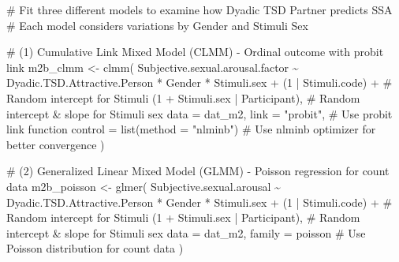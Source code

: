 \documentclass[
  bookmarksnumbered]{article}
\newenvironment{Shaded}{\begin{snugshade}}{\end{snugshade}}
\newcommand{\AttributeTok}[1]{\textcolor[rgb]{0.80,0.80,0.80}{#1}}
\newcommand{\CommentTok}[1]{\textcolor[rgb]{0.50,0.62,0.50}{#1}}
\newcommand{\DecValTok}[1]{\textcolor[rgb]{0.86,0.86,0.80}{#1}}
\newcommand{\FunctionTok}[1]{\textcolor[rgb]{0.94,0.94,0.56}{#1}}
\newcommand{\NormalTok}[1]{\textcolor[rgb]{0.80,0.80,0.80}{#1}}
\newcommand{\OtherTok}[1]{\textcolor[rgb]{0.94,0.94,0.56}{#1}}
\newcommand{\SpecialCharTok}[1]{\textcolor[rgb]{0.86,0.64,0.64}{#1}}
\newcommand{\StringTok}[1]{\textcolor[rgb]{0.80,0.58,0.58}{#1}}
\begin{document}
\begin{Shaded}
\begin{Highlighting}[]
\CommentTok{\# Fit three different models to examine how Dyadic TSD Partner predicts SSA}
\CommentTok{\# Each model considers variations by Gender and Stimuli Sex}

\CommentTok{\# (1) Cumulative Link Mixed Model (CLMM) {-} Ordinal outcome with probit link}
\NormalTok{m2b\_clmm }\OtherTok{\textless{}{-}} \FunctionTok{clmm}\NormalTok{(}
\NormalTok{  Subjective.sexual.arousal.factor }\SpecialCharTok{\textasciitilde{}}\NormalTok{ Dyadic.TSD.Attractive.Person }\SpecialCharTok{*}\NormalTok{ Gender }\SpecialCharTok{*}\NormalTok{ Stimuli.sex }\SpecialCharTok{+}
\NormalTok{    (}\DecValTok{1} \SpecialCharTok{|}\NormalTok{ Stimuli.code) }\SpecialCharTok{+} \CommentTok{\# Random intercept for Stimuli}
\NormalTok{    (}\DecValTok{1} \SpecialCharTok{+}\NormalTok{ Stimuli.sex }\SpecialCharTok{|}\NormalTok{ Participant), }\CommentTok{\# Random intercept \& slope for Stimuli sex}
  \AttributeTok{data =}\NormalTok{ dat\_m2,}
  \AttributeTok{link =} \StringTok{"probit"}\NormalTok{, }\CommentTok{\# Use probit link function}
  \AttributeTok{control =} \FunctionTok{list}\NormalTok{(}\AttributeTok{method =} \StringTok{"nlminb"}\NormalTok{) }\CommentTok{\# Use \textquotesingle{}nlminb\textquotesingle{} optimizer for better convergence}
\NormalTok{)}

\CommentTok{\# (2) Generalized Linear Mixed Model (GLMM) {-} Poisson regression for count data}
\NormalTok{m2b\_poisson }\OtherTok{\textless{}{-}} \FunctionTok{glmer}\NormalTok{(}
\NormalTok{  Subjective.sexual.arousal }\SpecialCharTok{\textasciitilde{}}\NormalTok{ Dyadic.TSD.Attractive.Person }\SpecialCharTok{*}\NormalTok{ Gender }\SpecialCharTok{*}\NormalTok{ Stimuli.sex }\SpecialCharTok{+}
\NormalTok{    (}\DecValTok{1} \SpecialCharTok{|}\NormalTok{ Stimuli.code) }\SpecialCharTok{+} \CommentTok{\# Random intercept for Stimuli}
\NormalTok{    (}\DecValTok{1} \SpecialCharTok{+}\NormalTok{ Stimuli.sex }\SpecialCharTok{|}\NormalTok{ Participant), }\CommentTok{\# Random intercept \& slope for Stimuli sex}
  \AttributeTok{data =}\NormalTok{ dat\_m2,}
  \AttributeTok{family =}\NormalTok{ poisson }\CommentTok{\# Use Poisson distribution for count data}
\NormalTok{)}


\end{Highlighting}
\end{Shaded}
\end{document}
